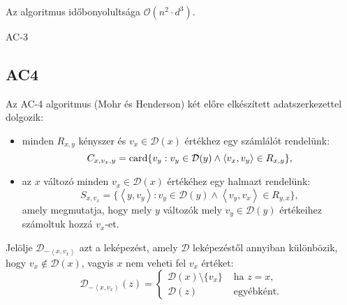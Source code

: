 Az algoritmus időbonyolultsága $\mathcal{O}(n^2 \cdot d^3)$.

\begin{algorithm}[H]
    {
        \;
    }
    \caption{AC-3}
\end{algorithm}

\subsection{AC4}

Az AC-4 algoritmus (Mohr és Henderson) két előre elkészített
adatszerkezettel dolgozik:

\begin{itemize}
    \item minden $R_{x,y}$ kényszer és $v_x \in  \mathcal{D}(x)$ értékhez egy
         számlálót rendelünk: \[
             C_{x,v_x,y} =
             \operatorname{card} \{v_y : v_y \in \mathcal{D}(y) \land \langle v_x, v_y \rangle \in R_{x,y}\}
         ,\]
     \item az $x$ változó minden $v_x \in \mathcal{D}(x)$ értékéhez egy halmazt
         rendelünk: \[
            S_{x,v_x} = \{
                \left<y, v_y \right> :
                v_y \in \mathcal{D}(y) \land
                \left<v_y, v_x \right> \in R_{y,x}
            \}
        ,\]
        amely megmutatja, hogy mely $y$ változók mely $v_y \in \mathcal{D}(y)$ értékeihez
        számoltuk hozzá $v_x$-et.
\end{itemize}

Jelölje $\mathcal{D}_{-\left<x, v_x \right>}$ azt a leképezést, amely
$\mathcal{D}$ leképezéstől annyiban különbözik, hogy $v_x \not\in
\mathcal{D}(x)$, vagyis $x$ nem veheti fel $v_x$ értéket: \[
    \mathcal{D}_{-\left<x, v_x \right>}(z) =
    \begin{cases}
        \mathcal{D}(x)\setminus \{v_x\} & \text{ ha } z=x,\\
        \mathcal{D}(z) & \text{ egyébként.}
    \end{cases}
\]

